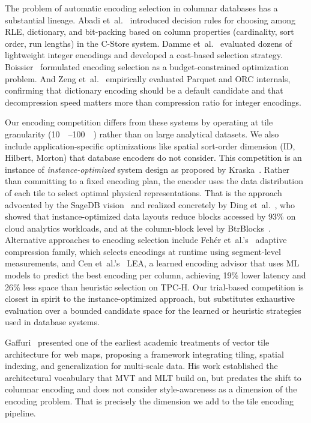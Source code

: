 The problem of automatic encoding selection in columnar databases has a substantial lineage.
Abadi et~al.~\cite{abadiIntegratingCompressionExecution2006} introduced decision rules for choosing among \ac{RLE}, dictionary, and bit-packing based on column properties (cardinality, sort order, run lengths) in the C-Store system.
Damme et~al.~\cite{dammeComprehensiveExperimentalSurvey2019} evaluated dozens of lightweight integer encodings and developed a cost-based selection strategy.
Boissier~\cite{ganBaguaScalingDistributed2021} formulated encoding selection as a budget-constrained optimization problem.
And Zeng et~al.~\cite{zengEmpiricalEvaluationColumnar2023} empirically evaluated Parquet and ORC internals, confirming that dictionary encoding should be a default candidate and that decompression speed matters more than compression ratio for integer encodings.

Our encoding competition differs from these systems by operating at tile granularity (\qtyrange{10}{100}{\kilo\byte}) rather than on large analytical datasets.
We also include application-specific optimizations like spatial sort-order dimension (ID, Hilbert, Morton) that database encoders do not consider.
This competition is an instance of \emph{instance-optimized} system design as proposed by Kraska~\cite{dingSageDBInstanceOptimizedData2022}.
Rather than committing to a fixed encoding plan, the encoder uses the data distribution of each tile to select optimal physical representations.
That is the approach advocated by the SageDB vision~\cite{dingSageDBInstanceOptimizedData2022} and realized concretely by Ding et~al.~\cite{dingInstanceOptimizedDataLayouts2021}, who showed that instance-optimized data layouts reduce blocks accessed by 93\% on cloud analytics workloads, and at the column-block level by BtrBlocks~\cite{kuschewskiBtrBlocksEfficientColumnar2023}.
Alternative approaches to encoding selection include Fehér et~al.'s~\cite{feherAdaptiveColumnCompression2022} adaptive compression family, which selects encodings at runtime using segment-level measurements, and Cen et~al.'s~\cite{cenLEALearnedEncoding2021} LEA, a learned encoding advisor that uses ML models to predict the best encoding per column, achieving 19\% lower latency and 26\% less space than heuristic selection on TPC-H.
Our trial-based competition is closest in spirit to the instance-optimized approach, but substitutes exhaustive evaluation over a bounded candidate space for the learned or heuristic strategies used in database systems.

Gaffuri~\cite{gaffuriWebMappingVector2012} presented one of the earliest academic treatments of vector tile architecture for web maps, proposing a framework integrating tiling, spatial indexing, and generalization for multi-scale data.
His work established the architectural vocabulary that \ac{MVT} and \ac{MLT} build on, but predates the shift to columnar encoding and does not consider style-awareness as a dimension of the encoding problem.
That is precisely the dimension we add to the tile encoding pipeline.

